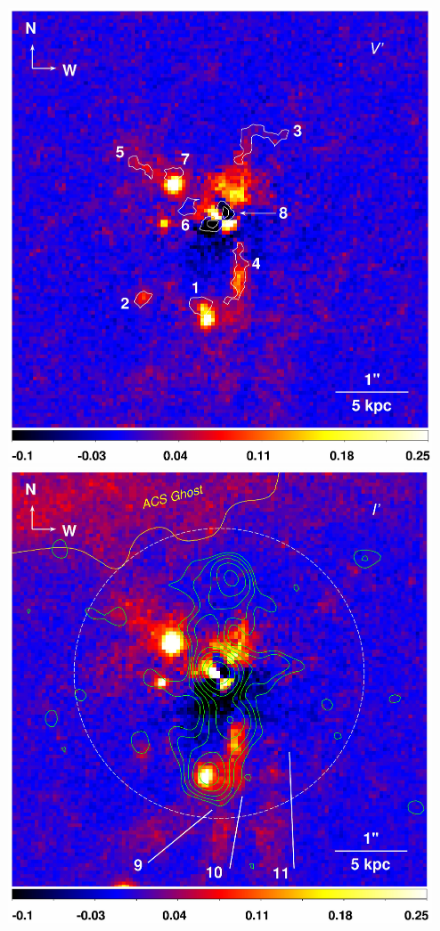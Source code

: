 \begin{figure}
  \begin{center}
    \begin{minipage}{0.495\linewidth}
      \includegraphics*[width=\textwidth, trim=0mm 0mm 0mm 0mm, clip]{arx_suboptcolor.ps}
    \end{minipage}
    \begin{minipage}{0.495\linewidth}
      \includegraphics*[width=\textwidth, trim=0mm 0mm 0mm 0mm, clip]{arx_suboptrad.ps}

\end{minipage}
\end{center}
\end{figure}
